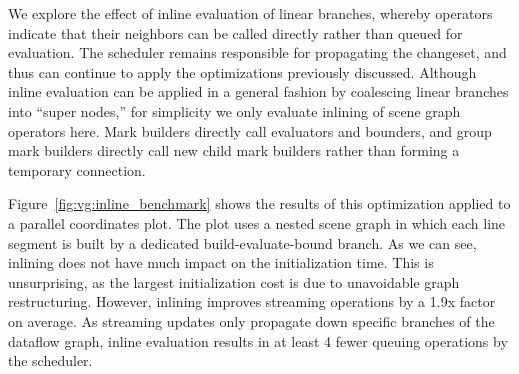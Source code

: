 We explore the effect of inline evaluation of linear branches, whereby operators
indicate that their neighbors can be called directly rather than queued for
evaluation. The scheduler remains responsible for propagating the changeset,
and thus can continue to apply the optimizations previously discussed. Although
inline evaluation can be applied in a general fashion by coalescing linear
branches into ``super nodes,'' for simplicity we only evaluate inlining of scene
graph operators here. Mark builders directly call evaluators and bounders, and
group mark builders directly call new child mark builders rather than forming a
temporary connection.

Figure~\ref{fig:vg:inline_benchmark} shows the results of this optimization
applied to a parallel coordinates plot. The plot uses a nested scene graph in
which each line segment is built by a dedicated build-evaluate-bound branch. As
we can see, inlining does not have much impact on the initialization time. This
is unsurprising, as the largest initialization cost is due to unavoidable graph
restructuring. However, inlining improves streaming operations by a 1.9x factor
on average. As streaming updates only propagate down specific branches of the
dataflow graph, inline evaluation results in at least 4 fewer queuing operations
by the scheduler.